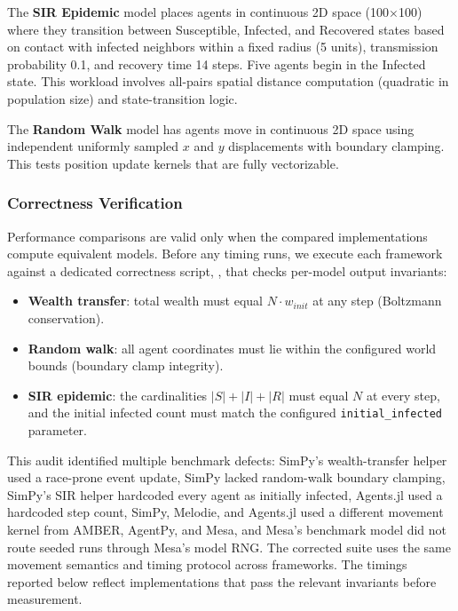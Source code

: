 \documentclass[11pt,a4paper]{article}
\begin{document}
The \textbf{SIR Epidemic} model places agents in continuous 2D space (100$\times$100) where they transition between Susceptible, Infected, and Recovered states based on contact with infected neighbors within a fixed radius (5 units), transmission probability 0.1, and recovery time 14 steps. Five agents begin in the Infected state. This workload involves all-pairs spatial distance computation (quadratic in population size) and state-transition logic.

The \textbf{Random Walk} model has agents move in continuous 2D space using independent uniformly sampled $x$ and $y$ displacements with boundary clamping. This tests position update kernels that are fully vectorizable.

\subsubsection{Correctness Verification}

Performance comparisons are valid only when the compared implementations compute equivalent models. Before any timing runs, we execute each framework against a dedicated correctness script, , that checks per-model output invariants:

\begin{itemize}
\item \textbf{Wealth transfer}: total wealth must equal $N \cdot w_{init}$ at any step (Boltzmann conservation).
\item \textbf{Random walk}: all agent coordinates must lie within the configured world bounds (boundary clamp integrity).
\item \textbf{SIR epidemic}: the cardinalities $|S| + |I| + |R|$ must equal $N$ at every step, and the initial infected count must match the configured \texttt{initial\_infected} parameter.
\end{itemize}

This audit identified multiple benchmark defects: SimPy's wealth-transfer helper used a race-prone event update, SimPy lacked random-walk boundary clamping, SimPy's SIR helper hardcoded every agent as initially infected, Agents.jl used a hardcoded step count, SimPy, Melodie, and Agents.jl used a different movement kernel from AMBER, AgentPy, and Mesa, and Mesa's benchmark model did not route seeded runs through Mesa's model RNG. The corrected suite uses the same movement semantics and timing protocol across frameworks. The timings reported below reflect implementations that pass the relevant invariants before measurement.
\end{document}
